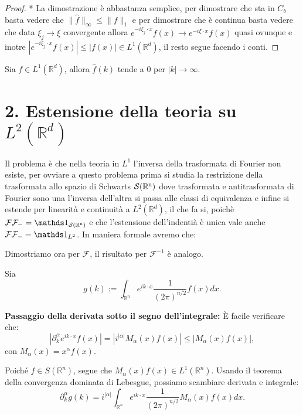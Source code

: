 \begin{proof} *
    La dimostrazione è abbastanza semplice, per dimostrare che sta in $C_b$ basta vedere che $\| \hat{f}\|_\infty \leq \| f\|_1$ e per dimostrare che è continua basta vedere che data $\xi_j \to \xi$ convergente allora $e^{-i \xi_j \cdot x} f(x) \to e^{-i \xi \cdot x} f(x)$ quasi ovunque e inotre $|e^{-i \xi_j \cdot x} f(x)| \leq |f(x)| \in L^1(\mathbb{R}^d)$, il resto segue facendo i conti.
\end{proof}


\begin{proposition}
    Sia $f \in L^1(\mathbb{R}^d)$, allora $\hat{f}(k)$ tende a $0$ per $|k| \to \infty$.
\end{proposition}



\section*{2. Estensione della teoria su $L^2(\mathbb{R}^d)$}
Il problema è che nella teoria in $L^1$ l'inversa della trasformata di Fourier non esiste, per ovviare a questo problema prima si studia la restrizione della trasformata allo spazio di Schwarts $\operatorname{\mathcal{S}(\mathbb{R}^n)}$ dove trasformata e antitrasformata di Fourier sono una l'inversa dell'altra si passa alle classi di equivalenza e infine si estende per linearità e continuità a $L^2(\mathbb{R}^d)$, il che fa si, poichè $\mathcal{F}\mathcal{F}_- = \un_{\Sw}$ e che l'estensione dell'indentià è unica vale anche $\mathcal{F}\mathcal{F}_- = \un_{L^2}$. In maniera formale avremo che:
\begin{theorem}
    
\end{theorem}

 Dimostriamo ora per $\mathcal{F}$, il risultato per $\mathcal{F}^{-1}$ è analogo.

Sia
\begin{equation*}
    g(k) := \int_{\mathbb{R}^n} e^{i k \cdot x} \frac{1}{(2\pi)^{n/2}} f(x) dx.
\end{equation*}

\textbf{Passaggio della derivata sotto il segno dell'integrale:} È facile verificare che:
\begin{equation*}
    |\partial_k^\alpha e^{i k \cdot x} f(x)| = |i^{|\alpha|} M_\alpha(x) f(x)| \leq |M_\alpha(x) f(x)|,
\end{equation*}
con $M_\alpha(x) = x^\alpha f(x)$. 

Poiché $f \in S(\mathbb{R}^n)$, segue che $M_\alpha(x) f(x) \in L^1(\mathbb{R}^n)$. Usando il teorema della convergenza dominata di Lebesgue, possiamo scambiare derivata e integrale:
\begin{equation*}
    \partial_k^\alpha g(k) = i^{|\alpha|} \int_{\mathbb{R}^n} e^{i k \cdot x} \frac{1}{(2\pi)^{n/2}} M_\alpha(x) f(x) dx.
\end{equation*}

